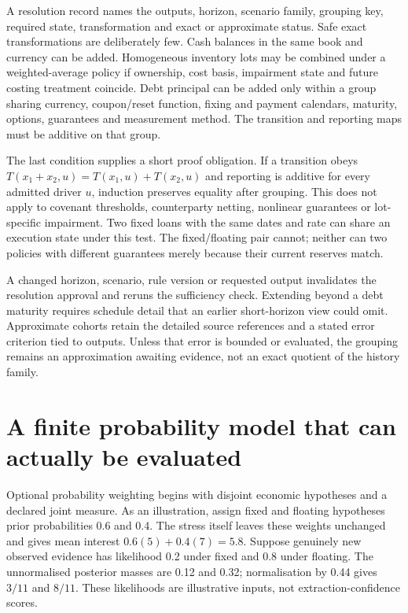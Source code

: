 A resolution record names the outputs, horizon, scenario family, grouping key,
required state, transformation and exact or approximate status. Safe exact
transformations are deliberately few. Cash balances in the same book and
currency can be added. Homogeneous inventory lots may be combined under a
weighted-average policy if ownership, cost basis, impairment state and future
costing treatment coincide. Debt principal can be added only within a group
sharing currency, coupon/reset function, fixing and payment calendars,
maturity, options, guarantees and measurement method. The transition and
reporting maps must be additive on that group.

The last condition supplies a short proof obligation. If a transition obeys
$T(x_1+x_2,u)=T(x_1,u)+T(x_2,u)$ and reporting is additive for every admitted
driver $u$, induction preserves equality after grouping. This does not apply
to covenant thresholds, counterparty netting, nonlinear guarantees or
lot-specific impairment. Two fixed loans with the same dates and rate can
share an execution state under this test. The fixed/floating pair cannot;
neither can two policies with different guarantees merely because their
current reserves match.

A changed horizon, scenario, rule version or requested output invalidates the
resolution approval and reruns the sufficiency check. Extending beyond a debt
maturity requires schedule detail that an earlier short-horizon view could
omit. Approximate cohorts retain the detailed source references and a stated
error criterion tied to outputs. Unless that error is bounded or evaluated,
the grouping remains an approximation awaiting evidence, not an exact quotient
of the history family.

\section{A finite probability model that can actually be evaluated}

Optional probability weighting begins with disjoint economic hypotheses and
a declared joint measure. As an illustration, assign fixed and floating
hypotheses prior probabilities 0.6 and 0.4. The stress itself leaves these
weights unchanged and gives mean interest $0.6(5)+0.4(7)=5.8$.
Suppose genuinely new observed evidence has likelihood 0.2 under fixed and
0.8 under floating. The unnormalised posterior masses are 0.12 and 0.32;
normalisation by 0.44 gives $3/11$ and $8/11$. These likelihoods are
illustrative inputs, not extraction-confidence scores.

